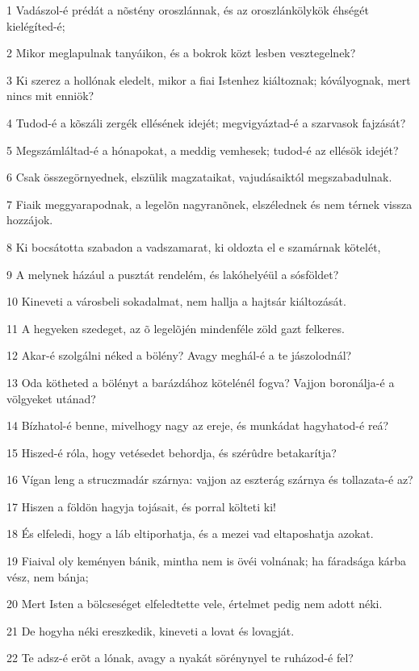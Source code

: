 \par 1 Vadászol-é prédát a nõstény oroszlánnak, és az oroszlánkölykök éhségét kielégíted-é;
\par 2 Mikor meglapulnak tanyáikon, és a bokrok közt lesben vesztegelnek?
\par 3 Ki szerez a hollónak eledelt, mikor a fiai Istenhez kiáltoznak; kóvályognak, mert nincs mit enniök?
\par 4 Tudod-é a kõszáli zergék ellésének idejét; megvigyáztad-é a szarvasok fajzását?
\par 5 Megszámláltad-é a hónapokat, a meddig vemhesek; tudod-é az ellésök idejét?
\par 6 Csak összegörnyednek, elszülik magzataikat, vajudásaiktól megszabadulnak.
\par 7 Fiaik meggyarapodnak, a legelõn nagyranõnek, elszélednek és nem térnek vissza hozzájok.
\par 8 Ki bocsátotta szabadon a vadszamarat, ki oldozta el e szamárnak kötelét,
\par 9 A melynek házául a pusztát rendelém, és lakóhelyéül a sósföldet?
\par 10 Kineveti a városbeli sokadalmat, nem hallja a hajtsár kiáltozását.
\par 11 A hegyeken szedeget, az õ legelõjén mindenféle zöld gazt felkeres.
\par 12 Akar-é szolgálni néked a bölény? Avagy meghál-é a te jászolodnál?
\par 13 Oda kötheted a bölényt a barázdához kötelénél fogva? Vajjon boronálja-é a völgyeket utánad?
\par 14 Bízhatol-é benne, mivelhogy nagy az ereje, és munkádat hagyhatod-é reá?
\par 15 Hiszed-é róla, hogy vetésedet behordja, és szérûdre betakarítja?
\par 16 Vígan leng a struczmadár szárnya: vajjon az eszterág szárnya és tollazata-é az?
\par 17 Hiszen a földön hagyja tojásait, és porral költeti ki!
\par 18 És elfeledi, hogy a láb eltiporhatja, és a mezei vad eltaposhatja azokat.
\par 19 Fiaival oly keményen bánik, mintha nem is övéi volnának; ha fáradsága kárba vész, nem bánja;
\par 20 Mert Isten a bölcseséget elfeledtette vele, értelmet pedig nem adott néki.
\par 21 De hogyha néki ereszkedik, kineveti a lovat és lovagját.
\par 22 Te adsz-é erõt a lónak, avagy a nyakát sörénynyel te ruházod-é fel?
